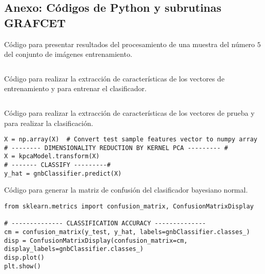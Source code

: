 
\begin{appendix}

\chapter{Anexo: Códigos de Python y subrutinas GRAFCET}

\begin{code}
	\caption{Código para presentar resultados del procesamiento de una muestra del número $5$ del conjunto de imágenes entrenamiento.}
	\label{code:test_samples_code}
	\centering
	\inputminted{python}{3_Reconocimiento/Codes/image_processing_test.py}
\end{code}

\begin{code}
	\caption{Código para realizar la extracción de características de los vectores de entrenamiento y para entrenar el clasificador.}
	\label{code:features_extracting}
	\centering
	\inputminted{python}{3_Reconocimiento/Codes/features_extracting.py}
\end{code}

\begin{code}
\caption{Código para realizar la extracción de características de los vectores de prueba y para realizar la clasificación.}
\label{code:sample_classifying}
\centering
\begin{verbatim}
X = np.array(X)  # Convert test sample features vector to numpy array
# -------- DIMENSIONALITY REDUCTION BY KERNEL PCA --------- #
X = kpcaModel.transform(X)
# ------- CLASSIFY ---------#
y_hat = gnbClassifier.predict(X)

\end{verbatim}
\end{code}

\begin{code}
\caption{Código para generar la matriz de confusión del clasificador bayesiano normal.}
\label{code:confusion_matrix}
\centering
\begin{verbatim}
from sklearn.metrics import confusion_matrix, ConfusionMatrixDisplay

# -------------- CLASSIFICATION ACCURACY --------------
cm = confusion_matrix(y_test, y_hat, labels=gnbClassifier.classes_)
disp = ConfusionMatrixDisplay(confusion_matrix=cm, display_labels=gnbClassifier.classes_)
disp.plot()
plt.show()
\end{verbatim}
\end{code}


\end{appendix}
